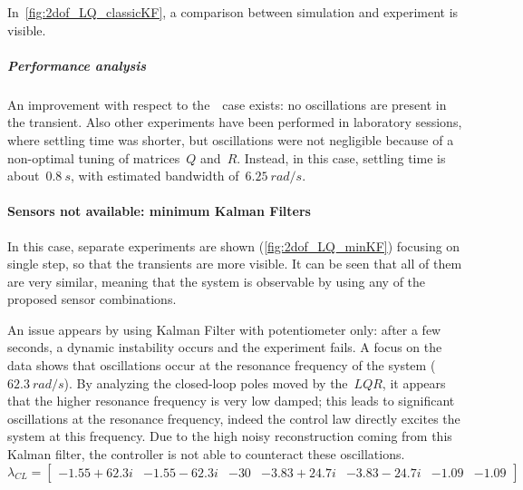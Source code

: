 In~\cref{fig:2dof_LQ_classicKF}, a comparison between simulation and experiment is visible.
\subparagraph{Performance analysis}
An improvement with respect to the~\onedof\ case exists: no oscillations are present in the transient. Also other experiments have been performed in laboratory sessions, where settling time was shorter, but oscillations were not negligible because of a non-optimal tuning of matrices~$Q$ and~$R$. Instead, in this case, settling time is about~$0.8\ s$, with estimated bandwidth of~$6.25\ rad/s$.

\paragraph{Sensors not available: minimum Kalman Filters}

In this case, separate experiments are shown (\cref{fig:2dof_LQ_minKF}) focusing on single step, so that the transients are more visible. It can be seen that all of them are very similar, meaning that the system is observable by using any of the proposed sensor combinations.

An issue appears by using Kalman Filter with potentiometer only: after a few seconds, a dynamic instability occurs and the experiment fails. A focus on the data shows that oscillations occur at the resonance frequency of the system ($62.3\ rad/s$).
By analyzing the closed-loop poles moved by the~$LQR$, it appears that the higher resonance frequency is very low damped; this leads to significant oscillations at the resonance frequency, indeed the control law directly excites the system at this frequency.
Due to the high noisy reconstruction coming from this Kalman filter, the controller is not able to counteract these oscillations.
\begin{equation}
	\lambda_{CL} =
	\begin{bmatrix}
		-1.55+62.3i & -1.55-62.3i & -30 & -3.83+24.7i & -3.83-24.7i & -1.09 & -1.09
	\end{bmatrix}
\end{equation}

